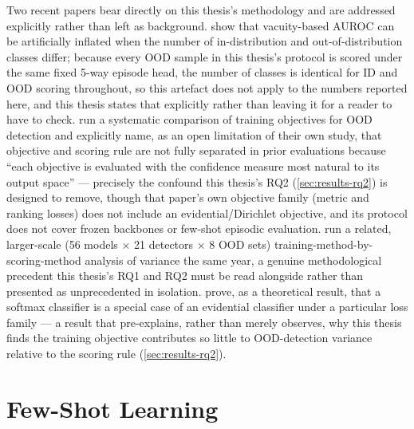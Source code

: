 \documentclass{iutbscthesis}
\begin{document}
Two recent papers bear directly on this thesis's methodology and are addressed explicitly rather than left as background. \textcite{mcnamara2026vacuity} show that vacuity-based AUROC can be artificially inflated when the number of in-distribution and out-of-distribution classes differ; because every OOD sample in this thesis's protocol is scored under the same fixed 5-way episode head, the number of classes is identical for ID and OOD scoring throughout, so this artefact does not apply to the numbers reported here, and this thesis states that explicitly rather than leaving it for a reader to have to check. \textcite{genc2026objectives} run a systematic comparison of training objectives for OOD detection and explicitly name, as an open limitation of their own study, that objective and scoring rule are not fully separated in prior evaluations because ``each objective is evaluated with the confidence measure most natural to its output space'' — precisely the confound this thesis's RQ2 (\autoref{sec:results-rq2}) is designed to remove, though that paper's own objective family (metric and ranking losses) does not include an evidential/Dirichlet objective, and its protocol does not cover frozen backbones or few-shot episodic evaluation. \textcite{krumpl2026onemodel} run a related, larger-scale (56 models $\times$ 21 detectors $\times$ 8 OOD sets) training-method-by-scoring-method analysis of variance the same year, a genuine methodological precedent this thesis's RQ1 and RQ2 must be read alongside rather than presented as unprecedented in isolation. \textcite{hayta2026pluginlosses} prove, as a theoretical result, that a softmax classifier is a special case of an evidential classifier under a particular loss family — a result that pre-explains, rather than merely observes, why this thesis finds the training objective contributes so little to OOD-detection variance relative to the scoring rule (\autoref{sec:results-rq2}).

\section{Few-Shot Learning}
\label{sec:related-fewshot}
\end{document}

